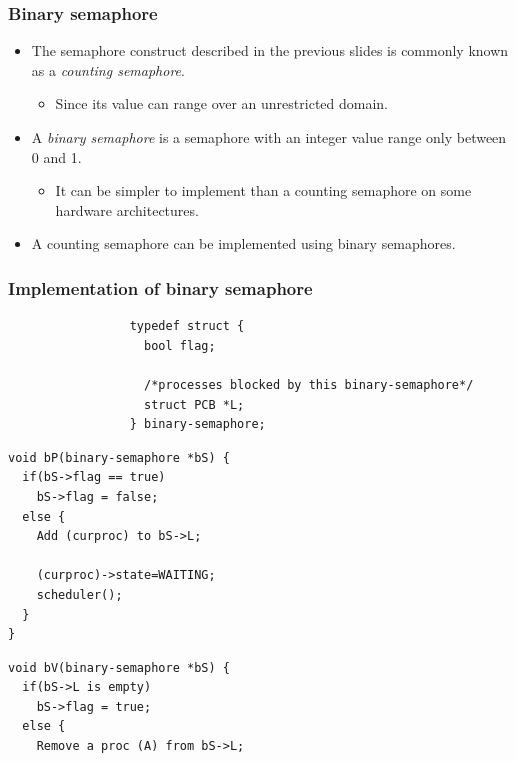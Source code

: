\documentclass[CJKutf8,xcolor=pdftex,dvipsnames,table]{beamer}
\begin{document}
\begin{CJK*}{UTF8}{song}
  \begin{frame}
  \frametitle{Binary semaphore} \pause
  \begin{itemize}
  \item{The semaphore construct described in the previous slides is commonly known as a \emph{counting semaphore}.} \pause
    \begin{itemize}
    \item{Since its value can range over an unrestricted domain.} \pause
    \end{itemize}
  \item{A \emph{binary semaphore} is a semaphore with an integer value range only between 0 and 1.} \pause
    \begin{itemize}
    \item{It can be simpler to implement than a counting semaphore on some hardware architectures.} \pause
    \end{itemize}
  \item{A counting semaphore can be implemented using binary semaphores.}
  \end{itemize}
  \end{frame}

  \begin{frame}[fragile]
  \frametitle{Implementation of binary semaphore} \pause

\begin{lstlisting}
                 typedef struct {
                   bool flag;

                   /*processes blocked by this binary-semaphore*/
                   struct PCB *L;
                 } binary-semaphore;
\end{lstlisting}

  \pause

  \begin{minipage}[c]{0.5\textwidth}

\begin{lstlisting}
void bP(binary-semaphore *bS) {
  if(bS->flag == true)
    bS->flag = false;
  else {
    Add (curproc) to bS->L;

    (curproc)->state=WAITING;
    scheduler();
  }
}
\end{lstlisting}

  \pause

  \end{minipage}%
  \begin{minipage}[c]{0.5\textwidth}

\begin{lstlisting}
void bV(binary-semaphore *bS) {
  if(bS->L is empty)
    bS->flag = true;
  else {
    Remove a proc (A) from bS->L;


\end{lstlisting}
\end{minipage}
\end{frame}
\end{CJK*}
\end{document}
